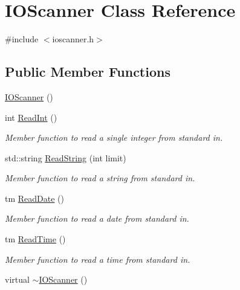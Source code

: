 \hypertarget{classIOScanner}{\section{\-I\-O\-Scanner \-Class \-Reference}
\label{classIOScanner}
}


{\ttfamily \#include $<$ioscanner.\-h$>$}

\subsection*{\-Public \-Member \-Functions}
\begin{DoxyCompactItemize}
\item 
\hyperlink{classIOScanner_a738f8672a1b98ce7edca8c1315982b69}{\-I\-O\-Scanner} ()
\item 
int \hyperlink{classIOScanner_a0fe8c5b740760937dbcd1e8fab7f91b9}{\-Read\-Int} ()
\begin{DoxyCompactList}\small\item\em \-Member function to read a single integer from standard in. \end{DoxyCompactList}\item 
std\-::string \hyperlink{classIOScanner_ae80cbd233c7da6a4756be74774772ea4}{\-Read\-String} (int limit)
\begin{DoxyCompactList}\small\item\em \-Member function to read a string from standard in. \end{DoxyCompactList}\item 
tm \hyperlink{classIOScanner_ab6196eddf07fed0ec799ac5114ed5ddb}{\-Read\-Date} ()
\begin{DoxyCompactList}\small\item\em \-Member function to read a date from standard in. \end{DoxyCompactList}\item 
tm \hyperlink{classIOScanner_ad88df6b3006a8a8c9c4fd07ad573232c}{\-Read\-Time} ()
\begin{DoxyCompactList}\small\item\em \-Member function to read a time from standard in. \end{DoxyCompactList}\item 
virtual \hyperlink{classIOScanner_a34d5d986a4e3c0d602c4837fc6cd9485}{$\sim$\-I\-O\-Scanner} ()
\end{DoxyCompactItemize}


